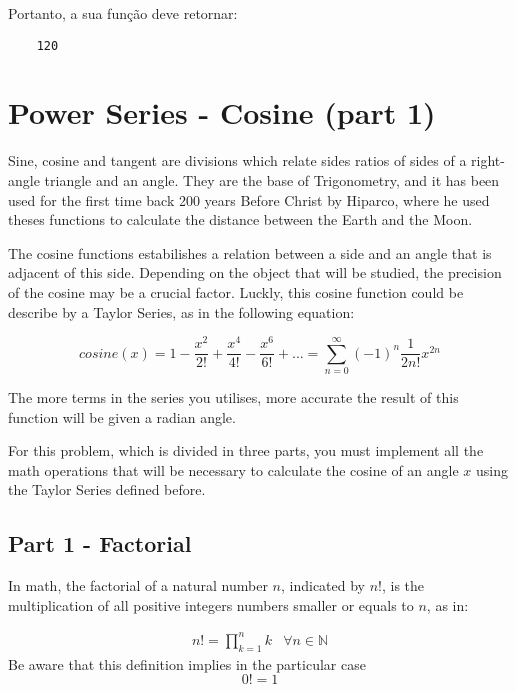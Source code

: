 Portanto, a sua função deve retornar:
\begin{lstlisting}
	120
\end{lstlisting}

\newpage

\section{Power Series - Cosine (part 1)}
Sine, cosine and tangent are divisions which relate sides ratios of sides of a right-angle triangle and an angle. They are the base of Trigonometry, and it has been used for the first time back 200 years Before Christ by Hiparco, where he used theses functions to calculate the distance between the Earth and the Moon. 

The cosine functions estabilishes a relation between a side and an angle that is adjacent of this side. Depending on the object that will be studied, the precision of the cosine may be a crucial factor. Luckly, this cosine function could be describe by a Taylor Series, as in the following equation:

\begin{equation*}
	cosine(x) = 1 - \frac{x^2}{2!} + \frac{x^4}{4!}-\frac{x^6}{6!}+...=\sum_{n = 0}^{\infty }(-1)^n\frac{1}{2n!}x^{2n}
\end{equation*}

The more terms in the series you utilises, more accurate the result of this function will be given a radian angle.


For this problem, which is divided in three parts, you must implement all the math operations that will be necessary to calculate the cosine of an angle $x$ using the Taylor Series defined before.

\subsection*{Part 1 - Factorial}
In math, the factorial of a natural number $n$, indicated by $n!$, is the multiplication of all positive integers numbers smaller or equals to $n$, as in:

\begin{equation*}
	\begin{matrix}
		n! = \prod_{k=1}^{n}k  & \forall n\in\mathbb{N}
	\end{matrix}
\end{equation*}
Be aware that this definition implies in the particular case
\begin{equation*}
	0! = 1
\end{equation*}

